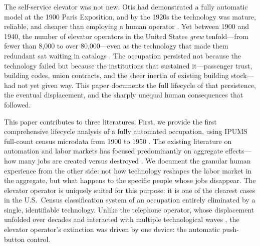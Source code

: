 \documentclass[12pt]{article}
\begin{document}
The self-service elevator was not new. Otis had demonstrated a fully automatic model at the 1900 Paris Exposition, and by the 1920s the technology was mature, reliable, and cheaper than employing a human operator \citep{goodwin2005}. Yet between 1900 and 1940, the number of elevator operators in the United States \emph{grew} tenfold---from fewer than 8,000 to over 80,000---even as the technology that made them redundant sat waiting in catalogs \citep{bernard2014}. The occupation persisted not because the technology failed but because the institutions that sustained it---passenger trust, building codes, union contracts, and the sheer inertia of existing building stock---had not yet given way. This paper documents the full lifecycle of that persistence, the eventual displacement, and the sharply unequal human consequences that followed.

This paper contributes to three literatures. First, we provide the first comprehensive lifecycle analysis of a fully automated occupation, using IPUMS full-count census microdata from 1900 to 1950 \citep{ruggles2024}. The existing literature on automation and labor markets has focused predominantly on aggregate effects---how many jobs are created versus destroyed \citep{acemoglu2020, autor2003, frey2017}. We document the granular human experience from the other side: not how technology reshapes the labor market in the aggregate, but what happens to the specific people whose jobs disappear. The elevator operator is uniquely suited for this purpose: it is one of the clearest cases in the U.S.\ Census classification system of an occupation entirely eliminated by a single, identifiable technology. Unlike the telephone operator, whose displacement unfolded over decades and interacted with multiple technological waves \citep{feigenbaum2024}, the elevator operator's extinction was driven by one device: the automatic push-button control.
\end{document}
